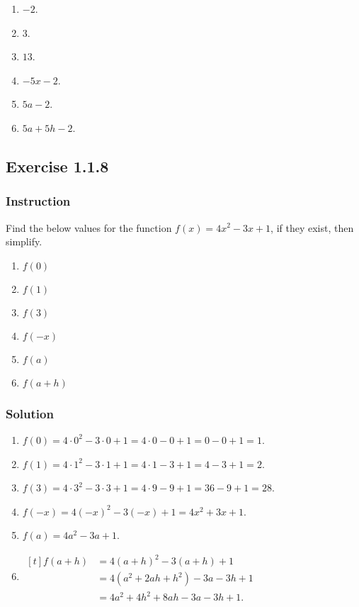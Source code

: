 \documentclass[11pt, letterpaper, oneside]{memoir}
\begin{document}
\begin{enumerate}[label=(\alph*)]
  \item $ -2 $.
  \item $ 3 $.
  \item $ 13 $.
  \item $ -5x - 2 $.
  \item $ 5a - 2 $.
  \item $ 5a + 5h - 2$.
\end{enumerate}

\subsection*{Exercise 1.1.8}

\subsubsection{Instruction}

Find the below values for the function $ f(x) = 4x^2 - 3x + 1 $, if they exist, then simplify.
\begin{enumerate}[label=(\alph*)]
  \item $ f(0) $
  \item $ f(1) $
  \item $ f(3) $
  \item $ f(-x) $
  \item $ f(a) $
  \item $ f(a + h) $
\end{enumerate}

\subsubsection{Solution}

\begin{enumerate}[label=(\alph*)]
  \item $ f(0) = 4 \cdot 0^2 - 3 \cdot 0 + 1 = 4 \cdot 0 - 0 + 1 = 0 - 0 + 1 = 1 $.
  \item $ f(1) = 4 \cdot 1^2 - 3 \cdot 1 + 1 = 4 \cdot 1 - 3 + 1 = 4 - 3 + 1 = 2 $.
  \item $ f(3) = 4 \cdot 3^2 - 3 \cdot 3 + 1 = 4 \cdot 9 - 9 + 1 = 36 - 9 + 1 = 28 $.
  \item $ f(-x) = 4(-x)^2 - 3(-x) + 1 = 4x^2 + 3x + 1 $.
  \item $ f(a) = 4a^2 - 3a + 1 $.
  \item
    \(
      \begin{aligned}[t]
        f(a + h) &= 4(a + h)^2 - 3(a + h) + 1 \\
        &= 4(a^2 + 2ah + h^2) - 3a - 3h + 1 \\
        &= 4a^2 + 4h^2 + 8ah -3a - 3h + 1.
      \end{aligned}
    \)

\end{enumerate}
\end{document}
